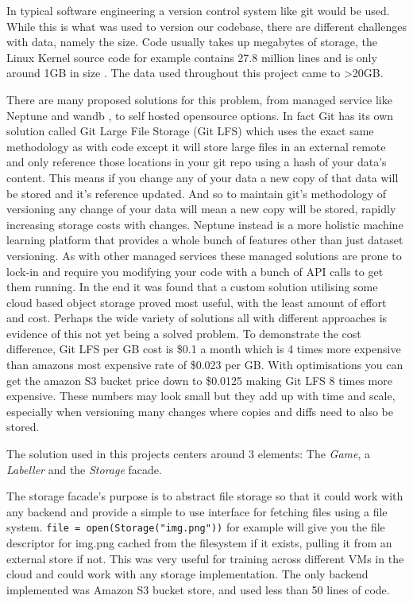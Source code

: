In typical software engineering a version control system like git \cite{} would be used.  While this is what was used to version our codebase, there
are different challenges with data, namely the size.  Code usually takes up megabytes of storage, the Linux Kernel source code for example contains
27.8 million lines and is only around 1GB in size \cite{}.  The data used throughout this project came to >20GB.

There are many proposed solutions for this problem, from managed service like Neptune \cite{} and wandb \cite{}, to self hosted opensource options.  In fact Git has its own
solution called Git Large File Storage (Git LFS) \cite{} which uses the exact same methodology as with code except it will store large files in an external 
remote and only reference those locations in your git repo using a hash of your data's content.  This means if you change any of your data a new copy 
of that data will be stored and it's reference updated.  And so to maintain git's methodology of versioning any change of your data will mean a new copy 
will be stored, rapidly increasing storage costs with changes.  Neptune instead is a more holistic machine learning platform that provides a whole bunch of 
features other than just dataset versioning.  As with other managed services these managed solutions are prone to lock-in and require you modifying your code 
with a bunch of API calls to get them running.
In the end it was found that a custom solution utilising some cloud based object storage proved most useful, with the least amount of effort and cost.  
Perhaps the wide variety of solutions all with different approaches is evidence of this not yet being
a solved problem.  To demonstrate the cost difference, Git LFS per GB cost is \$0.1 a month which is 4 times more expensive
than amazons most expensive rate of \$0.023 per GB.  With optimisations you can get the amazon S3 bucket price down to \$0.0125 making Git LFS 8 times
more expensive.  These numbers may look small but they add up with time and scale, especially when versioning many changes where copies and diffs need
to also be stored.

The solution used in this projects centers around 3 elements: The \textit{Game}, a \textit{Labeller} and the \textit{Storage} facade.  

The storage 
facade's purpose is to abstract file storage so that it could work with any backend and provide a simple to use interface for fetching files using a file system.
\verb|file = open(Storage("img.png"))| 
for example will give you the file descriptor for img.png cached from the filesystem if it exists, pulling it from an external store if not.  
This was very useful for training across different VMs in the cloud and could work with any storage implementation.
The only backend implemented was Amazon S3 bucket store, and used less than 50 lines of code.

